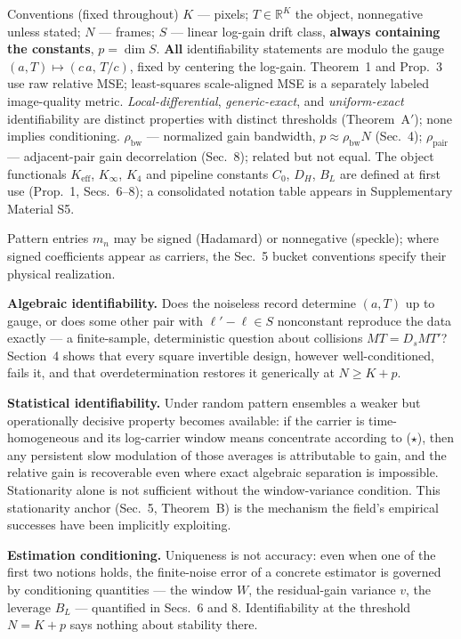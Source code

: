 \begin{nameddef}{Conventions (fixed throughout)}
$K$ --- pixels; $T\in\mathbb{R}^K$ the object, nonnegative unless stated; $N$ --- frames; $S$ --- linear log-gain drift class, \textbf{always containing the constants}, $p=\dim S$. \textbf{All} identifiability statements are modulo the gauge $(a,T)\mapsto(c\,a,\,T/c)$, fixed by centering the log-gain. Theorem~1 and Prop.~3 use raw relative MSE; least-squares scale-aligned MSE is a separately labeled image-quality metric. \emph{Local-differential}, \emph{generic-exact}, and \emph{uniform-exact} identifiability are distinct properties with distinct thresholds (Theorem~A$'$); none implies conditioning. $\rho_{\mathrm{bw}}$ --- normalized gain bandwidth, $p\approx\rho_{\mathrm{bw}}N$ (Sec.~4); $\rho_{\mathrm{pair}}$ --- adjacent-pair gain decorrelation (Sec.~8); related but not equal. The object functionals $K_{\mathrm{eff}}$, $K_\infty$, $K_4$ and pipeline constants $C_0$, $D_H$, $B_L$ are defined at first use (Prop.~1, Secs.~6--8); a consolidated notation table appears in Supplementary Material S5.
\end{nameddef}

Pattern entries $m_n$ may be signed (Hadamard) or nonnegative (speckle); where signed coefficients appear as carriers, the Sec.~5 bucket conventions specify their physical realization.

\noindent\textbf{Algebraic identifiability.} Does the noiseless record determine $(a,T)$ up to gauge, or does some other pair with $\ell' - \ell \in S$ nonconstant reproduce the data exactly --- a finite-sample, deterministic question about collisions $MT = D_s M T'$? Section~4 shows that every square invertible design, however well-conditioned, fails it, and that overdetermination restores it generically at $N \ge K + p$.

\noindent\textbf{Statistical identifiability.} Under random pattern ensembles a weaker but operationally decisive property becomes available: if the carrier is time-homogeneous and its log-carrier window means concentrate according to ($\star$), then any persistent slow modulation of those averages is attributable to gain, and the relative gain is recoverable even where exact algebraic separation is impossible. Stationarity alone is not sufficient without the window-variance condition. This stationarity anchor (Sec.~5, Theorem~B) is the mechanism the field's empirical successes have been implicitly exploiting.

\noindent\textbf{Estimation conditioning.} Uniqueness is not accuracy: even when one of the first two notions holds, the finite-noise error of a concrete estimator is governed by conditioning quantities --- the window $W$, the residual-gain variance $v$, the leverage $B_L$ --- quantified in Secs.~6 and 8. Identifiability at the threshold $N = K + p$ says nothing about stability there.

